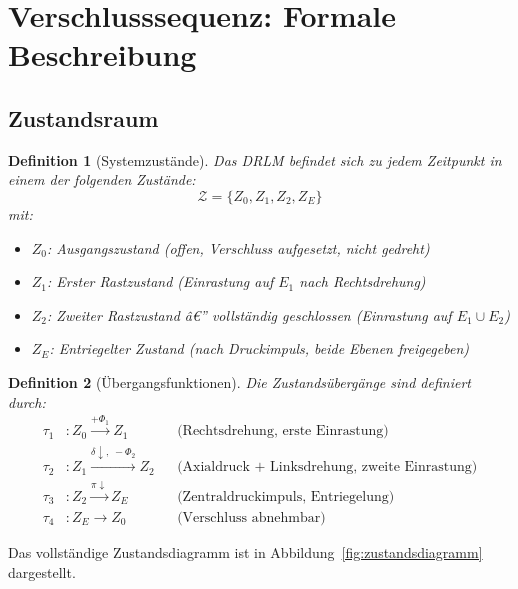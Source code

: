 ﻿\documentclass[12pt, a4paper]{article}
\newtheorem{definition}{Definition}[section]
\theoremstyle{remark}
\begin{document}
\section{Verschlusssequenz: Formale Beschreibung}

\subsection{Zustandsraum}

\begin{definition}[Systemzustände]
  Das DRLM befindet sich zu jedem Zeitpunkt in einem der folgenden Zustände:
  \[
    \mathcal{Z} = \{Z_0, Z_1, Z_2, Z_E\}
  \]
  mit:
  \begin{itemize}[noitemsep]
    \item $Z_0$: Ausgangszustand (offen, Verschluss aufgesetzt, nicht gedreht)
    \item $Z_1$: Erster Rastzustand (Einrastung auf $E_1$ nach Rechtsdrehung)
    \item $Z_2$: Zweiter Rastzustand â€” vollständig geschlossen (Einrastung auf $E_1 \cup E_2$)
    \item $Z_E$: Entriegelter Zustand (nach Druckimpuls, beide Ebenen freigegeben)
  \end{itemize}
\end{definition}

\begin{definition}[Übergangsfunktionen]
  Die Zustandsübergänge sind definiert durch:
  \begin{align}
    \tau_1 &: Z_0 \xrightarrow{+\Phi_1} Z_1 && \text{(Rechtsdrehung, erste Einrastung)}\\
    \tau_2 &: Z_1 \xrightarrow{\delta \downarrow,\; -\Phi_2} Z_2 && \text{(Axialdruck + Linksdrehung, zweite Einrastung)}\\
    \tau_3 &: Z_2 \xrightarrow{\pi \downarrow} Z_E && \text{(Zentraldruckimpuls, Entriegelung)}\\
    \tau_4 &: Z_E \xrightarrow{} Z_0 && \text{(Verschluss abnehmbar)}
  \end{align}
\end{definition}

Das vollständige Zustandsdiagramm ist in Abbildung~\ref{fig:zustandsdiagramm} dargestellt.
\end{document}
